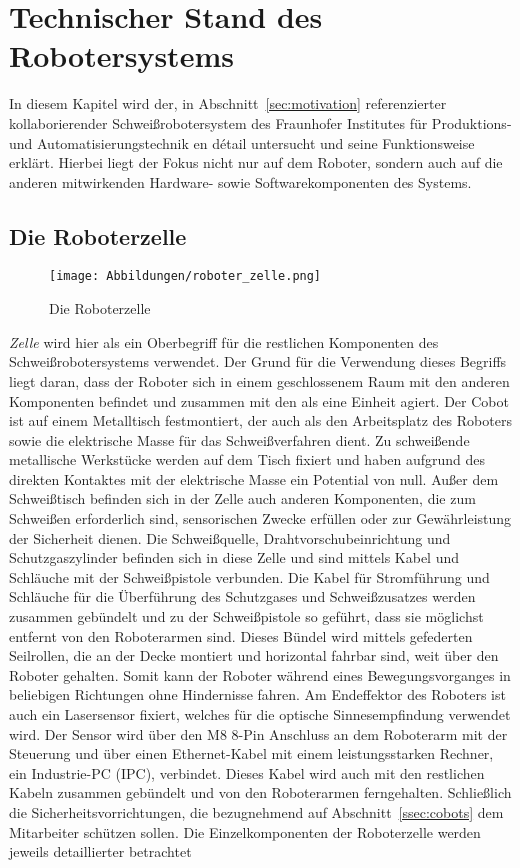 \chapter{Technischer Stand des Robotersystems}
In diesem Kapitel wird der, in Abschnitt~\ref{sec:motivation} referenzierter kollaborierender Schweißrobotersystem des Fraunhofer Institutes für Produktions- und Automatisierungstechnik en détail untersucht und seine Funktionsweise erklärt. Hierbei liegt der Fokus nicht nur auf dem Roboter, sondern auch auf die anderen mitwirkenden Hardware- sowie Softwarekomponenten des Systems.

\section{Die Roboterzelle}

\begin{figure}[b!]
	\texttt{[image: Abbildungen/roboter\_zelle.png]}
	\centering
	\caption{Die Roboterzelle}
\end{figure}
\emph{Zelle} wird hier als ein Oberbegriff für die restlichen Komponenten des Schweißrobotersystems verwendet. Der Grund für die Verwendung dieses Begriffs liegt daran, dass der Roboter sich in einem geschlossenem Raum mit den anderen Komponenten befindet und zusammen mit den als eine Einheit agiert. Der Cobot ist auf einem Metalltisch festmontiert, der auch als den Arbeitsplatz des Roboters sowie die elektrische Masse für das Schweißverfahren dient. Zu schweißende metallische Werkstücke werden auf dem Tisch fixiert und haben aufgrund des direkten Kontaktes mit der elektrische Masse ein Potential von null. Außer dem Schweißtisch befinden sich in der Zelle auch anderen Komponenten, die zum Schweißen erforderlich sind, sensorischen Zwecke erfüllen oder zur Gewährleistung der Sicherheit dienen. Die Schweißquelle, Drahtvorschubeinrichtung und Schutzgaszylinder befinden sich in diese Zelle und sind mittels Kabel und Schläuche mit der Schweißpistole verbunden. Die Kabel für Stromführung und Schläuche für die Überführung des Schutzgases und Schweißzusatzes werden zusammen gebündelt und zu der Schweißpistole so geführt, dass sie möglichst entfernt von den Roboterarmen sind. Dieses Bündel wird mittels gefederten Seilrollen, die an der Decke montiert und horizontal fahrbar sind, weit über den Roboter gehalten. Somit kann der Roboter während eines Bewegungsvorganges in beliebigen Richtungen ohne Hindernisse fahren. Am Endeffektor des Roboters ist auch ein Lasersensor fixiert, welches für die optische Sinnesempfindung verwendet wird. Der Sensor wird über den M8 8-Pin Anschluss an dem Roboterarm mit der Steuerung und über einen Ethernet-Kabel mit einem leistungsstarken Rechner, ein Industrie-PC (IPC), verbindet. Dieses Kabel wird auch mit den restlichen Kabeln zusammen gebündelt und von den Roboterarmen ferngehalten. Schließlich die Sicherheitsvorrichtungen, die bezugnehmend auf Abschnitt~\ref{ssec:cobots} dem Mitarbeiter schützen sollen. Die Einzelkomponenten der Roboterzelle werden jeweils detaillierter betrachtet

